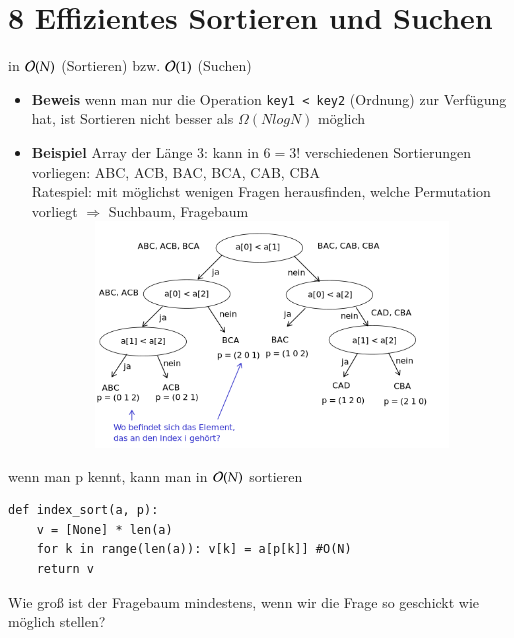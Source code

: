 
\chapter*{8 Effizientes Sortieren und Suchen}
in $\mathcal{O}{}(N)$ (Sortieren) bzw. $\mathcal{O}{}(1)$ (Suchen) \\
\begin{itemize}[label={}]
    \item \textbf{Beweis} wenn man nur die Operation \verb|key1 < key2| (Ordnung) zur Verfügung hat, ist Sortieren nicht besser als $\Omega (NlogN)$ möglich
    \item \textbf{Beispiel} Array der Länge 3: kann in $ 6 = 3!$ verschiedenen Sortierungen vorliegen: ABC, ACB, BAC, BCA, CAB, CBA \\
    Ratespiel: mit möglichst wenigen Fragen herausfinden, welche Permutation vorliegt $\Rightarrow$ Suchbaum, Fragebaum \\
    \includegraphics[width=16cm,height=6cm,keepaspectratio]{./Pictures/Fragebaum.png}
\end{itemize}
wenn man p kennt, kann man in $\mathcal{O}{}(N)$ sortieren
\begin{verbatim}
def index_sort(a, p):
    v = [None] * len(a)
    for k in range(len(a)): v[k] = a[p[k]] #O(N)
    return v
\end{verbatim}
\vspace*{0.5cm}
Wie groß ist der Fragebaum mindestens, wenn wir die Frage so geschickt wie möglich stellen?
